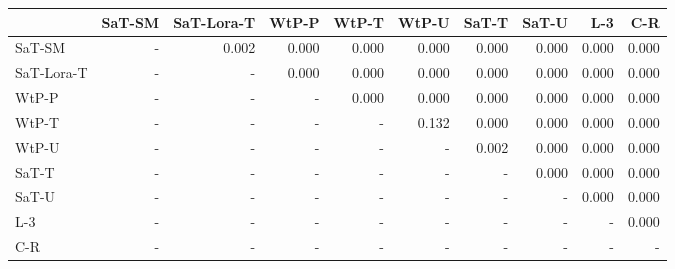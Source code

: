 \begin{tabular}{lrrrrrrrrr}
\toprule
 & SaT-SM & SaT-Lora-T & WtP-P & WtP-T & WtP-U & SaT-T & SaT-U & L-3 & C-R \\
\midrule
SaT-SM & - & 0.002 & 0.000 & 0.000 & 0.000 & 0.000 & 0.000 & 0.000 & 0.000 \\
SaT-Lora-T & - & - & 0.000 & 0.000 & 0.000 & 0.000 & 0.000 & 0.000 & 0.000 \\
WtP-P & - & - & - & 0.000 & 0.000 & 0.000 & 0.000 & 0.000 & 0.000 \\
WtP-T & - & - & - & - & 0.132 & 0.000 & 0.000 & 0.000 & 0.000 \\
WtP-U & - & - & - & - & - & 0.002 & 0.000 & 0.000 & 0.000 \\
SaT-T & - & - & - & - & - & - & 0.000 & 0.000 & 0.000 \\
SaT-U & - & - & - & - & - & - & - & 0.000 & 0.000 \\
L-3 & - & - & - & - & - & - & - & - & 0.000 \\
C-R & - & - & - & - & - & - & - & - & - \\
\bottomrule
\end{tabular}

